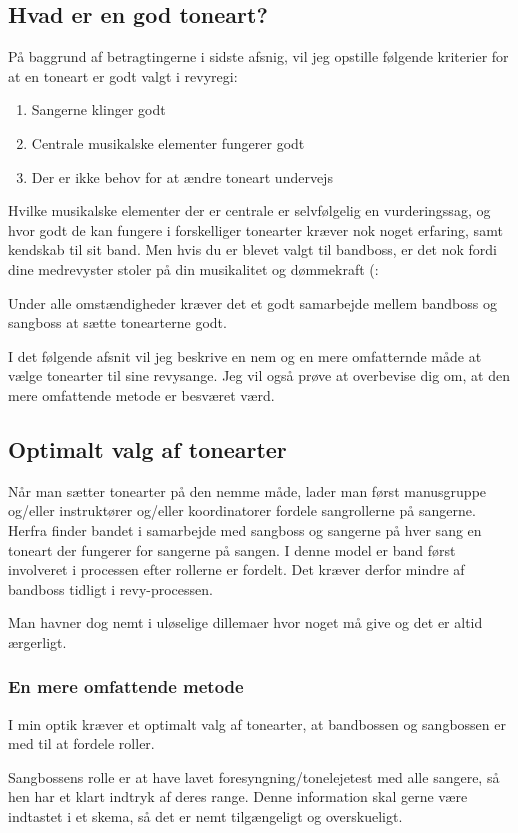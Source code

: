 \subsection{Hvad er en god toneart?}
På baggrund af betragtingerne i sidste afsnig, vil jeg opstille følgende kriterier for at en toneart er godt valgt i revyregi:
\begin{enumerate}
    \item Sangerne klinger godt
    \item Centrale musikalske elementer fungerer godt
    \item Der er ikke behov for at ændre toneart undervejs
\end{enumerate}
Hvilke musikalske elementer der er centrale er selvfølgelig en vurderingssag, og hvor godt de kan fungere i forskelliger tonearter kræver nok noget erfaring, samt kendskab til sit band. Men hvis du er blevet valgt til bandboss, er det nok fordi dine medrevyster stoler på din musikalitet og dømmekraft (:

Under alle omstændigheder kræver det et godt samarbejde mellem bandboss og sangboss at sætte tonearterne godt.

I det følgende afsnit vil jeg beskrive en nem og en mere omfatternde måde at vælge tonearter til sine revysange. Jeg vil også prøve at overbevise dig om, at den mere omfattende metode er besværet værd.

\subsection{Optimalt valg af tonearter}
Når man sætter tonearter på den nemme måde, lader man først manusgruppe og/eller instruktører og/eller koordinatorer fordele sangrollerne på sangerne. Herfra finder bandet i samarbejde med sangboss og sangerne på hver sang en toneart der fungerer for sangerne på sangen. I denne model er band først involveret i processen efter rollerne er fordelt. Det kræver derfor mindre af bandboss tidligt i revy-processen.

Man havner dog nemt i uløselige dillemaer hvor noget må give og det er altid ærgerligt.

\subsubsection{En mere omfattende metode}
I min optik kræver et optimalt valg af tonearter, at bandbossen og sangbossen er med til at fordele roller.

Sangbossens rolle er at have lavet foresyngning/tonelejetest med alle sangere, så hen har et klart indtryk af deres range. Denne information skal gerne være indtastet i et skema, så det er nemt tilgængeligt og overskueligt.

